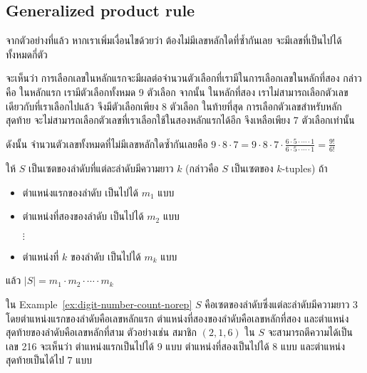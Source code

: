 \subsection{Generalized product rule}

\begin{example}\label{ex:digit-number-count-norep}
จากตัวอย่างที่แล้ว หากเราเพิ่มเงื่อนไขด้วยว่า ต้องไม่มีเลขหลักใดที่ซ้ำกันเลย จะมีเลขที่เป็นไปได้ทั้งหมดกี่ตัว

จะเห็นว่า การเลือกเลขในหลักแรกจะมีผลต่อจำนวนตัวเลือกที่เรามีในการเลือกเลขในหลักที่สอง กล่าวคือ ในหลักแรก เรามีตัวเลือกทั้งหมด 9 ตัวเลือก \enskip จากนั้น ในหลักที่สอง เราไม่สามารถเลือกตัวเลขเดียวกับที่เราเลือกไปแล้ว จึงมีตัวเลือกเพียง 8 ตัวเลือก \enskip ในท้ายที่สุด การเลือกตัวเลขสำหรับหลักสุดท้าย จะไม่สามารถเลือกตัวเลขที่เราเลือกใช้ในสองหลักแรกได้อีก จึงเหลือเพียง 7 ตัวเลือกเท่านั้น

ดังนั้น จำนวนตัวเลขทั้งหมดที่ไม่มีเลขหลักใดซ้ำกันเลยคือ $9\cdot 8\cdot 7=9\cdot 8\cdot 7\cdot\frac{6\cdot 5\cdot \cdots \cdot 1}{6\cdot 5\cdot \cdots \cdot 1}=\frac{9!}{6!}$
\end{example}

\begin{theorem}
ให้ $S$ เป็นเซตของลำดับที่แต่ละลำดับมีความยาว $k$ (กล่าวคือ $S$ เป็นเซตของ $k$-tuples) \enskip ถ้า
\begin{itemize}[]
\item ตำแหน่งแรกของลำดับ เป็นไปได้ $m_1$ แบบ
\item ตำแหน่งที่สองของลำดับ เป็นไปได้ $m_2$ แบบ
\item[$\vdots$]
\item ตำแหน่งที่ $k$ ของลำดับ เป็นไปได้ $m_k$ แบบ
\end{itemize}
แล้ว $|S|=m_1\cdot m_2\cdot \cdots \cdot m_k$
\end{theorem}

ใน Example~\ref{ex:digit-number-count-norep} $S$ คือเซตของลำดับซึ่งแต่ละลำดับมีความยาว 3 โดยตำแหน่งแรกของลำดับคือเลขหลักแรก ตำแหน่งที่สองของลำดับคือเลขหลักที่สอง และตำแหน่งสุดท้ายของลำดับคือเลขหลักที่สาม \enskip ตัวอย่างเช่น สมาชิก $(2, 1, 6)$ ใน $S$ จะสามารถตีความได้เป็นเลข 216 \enskip จะเห็นว่า ตำแหน่งแรกเป็นไปได้ 9 แบบ ตำแหน่งที่สองเป็นไปได้ 8 แบบ และตำแหน่งสุดท้ายเป็นได้ไป 7 แบบ

